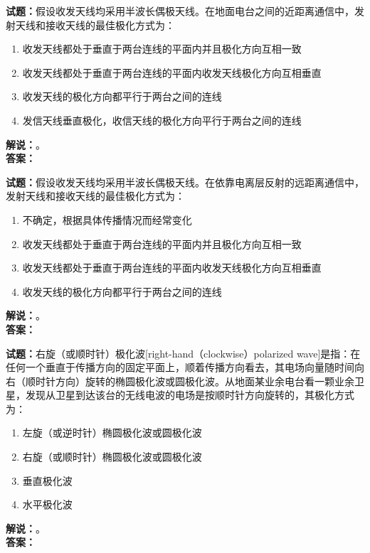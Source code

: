 \documentclass{ctexbook}
\begin{document}
\bigskip




\noindent\textbf{试题：}假设收发天线均采用半波长偶极天线。在地面电台之间的近距离通信中，发射天线和接收天线的最佳极化方式为：
\begin{enumerate}[leftmargin=3em]
\item 收发天线都处于垂直于两台连线的平面内并且极化方向互相一致
\item 收发天线都处于垂直于两台连线的平面内收发天线极化方向互相垂直
\item 收发天线的极化方向都平行于两台之间的连线
\item 发信天线垂直极化，收信天线的极化方向平行于两台之间的连线
\end{enumerate}
\noindent\textbf{解说：}\textbf{}。\\\noindent\textbf{答案：}

\bigskip




\noindent\textbf{试题：}假设收发天线均采用半波长偶极天线。在依靠电离层反射的远距离通信中，发射天线和接收天线的最佳极化方式为：
\begin{enumerate}[leftmargin=3em]
\item 不确定，根据具体传播情况而经常变化
\item 收发天线都处于垂直于两台连线的平面内并且极化方向互相一致
\item 收发天线都处于垂直于两台连线的平面内收发天线极化方向互相垂直
\item 收发天线的极化方向都平行于两台之间的连线
\end{enumerate}
\noindent\textbf{解说：}\textbf{}。\\\noindent\textbf{答案：}

\bigskip




\noindent\textbf{试题：}右旋（或顺时针）极化波[right-hand（clockwise）polarized wave]是指：在任何一个垂直于传播方向的固定平面上，顺着传播方向看去，其电场向量随时间向右（顺时针方向）旋转的椭圆极化波或圆极化波。从地面某业余电台看一颗业余卫星，发现从卫星到达该台的无线电波的电场是按顺时针方向旋转的，其极化方式为：
\begin{enumerate}[leftmargin=3em]
\item 左旋（或逆时针）椭圆极化波或圆极化波
\item 右旋（或顺时针）椭圆极化波或圆极化波
\item 垂直极化波
\item 水平极化波
\end{enumerate}
\noindent\textbf{解说：}\textbf{}。\\\noindent\textbf{答案：}
\end{document}
